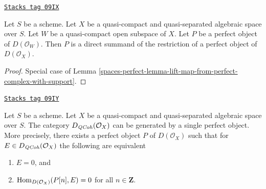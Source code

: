 \begin{lemma}
\label{spaces-perfect-lemma-direct-summand-of-a-restriction}
\href{https://stacks.math.columbia.edu/tag/09IX}{\texttt{Stacks tag 09IX}}

Let $S$ be a scheme.
Let $X$ be a quasi-compact and quasi-separated algebraic space over $S$.
Let $W$ be a quasi-compact open subspace of $X$.
Let $P$ be a perfect object of $D(\mathcal{O}_W)$.
Then $P$ is a direct summand of the restriction of a perfect
object of $D(\mathcal{O}_X)$.
\end{lemma}

\begin{proof}
Special case of Lemma \ref{spaces-perfect-lemma-lift-map-from-perfect-complex-with-support}.
\end{proof}

\begin{theorem}
\label{spaces-perfect-theorem-bondal-van-den-Bergh}
\href{https://stacks.math.columbia.edu/tag/09IY}{\texttt{Stacks tag 09IY}}

Let $S$ be a scheme. Let $X$ be a quasi-compact and quasi-separated
algebraic space over $S$. The category
$D_{\mathit{QCoh}}(\mathcal{O}_X)$ can be generated by a single
perfect object. More precisely, there exists a perfect object
$P$ of $D(\mathcal{O}_X)$ such that for
$E \in D_{\mathit{QCoh}}(\mathcal{O}_X)$ the following are equivalent
\begin{enumerate}
\item $E = 0$, and
\item $\operatorname{Hom}_{D(\mathcal{O}_X)}(P[n], E) = 0$ for all $n \in \mathbf{Z}$.
\end{enumerate}
\end{theorem}


